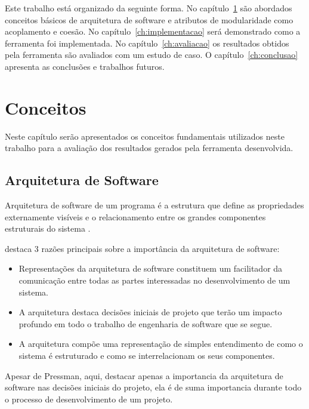 Este trabalho está organizado da seguinte forma. No capítulo~\ref{ch:conceitos}
são abordados conceitos básicos de arquitetura de software e atributos de
modularidade como acoplamento e coesão. No capítulo~\ref{ch:implementacao} será
demonstrado como a ferramenta foi implementada. No capítulo~\ref{ch:avaliacao}
os resultados obtidos pela ferramenta são avaliados com um estudo de caso. O
capítulo~\ref{ch:conclusao} apresenta as conclusões e trabalhos futuros.


\chapter{Conceitos} \label{ch:conceitos}

Neste capítulo serão apresentados os conceitos fundamentais utilizados neste
trabalho para a avaliação dos resultados gerados pela ferramenta desenvolvida.

\section{Arquitetura de Software}

Arquitetura de software de um programa é a estrutura que define as propriedades
externamente visíveis e o relacionamento entre os grandes componentes
estruturais do sistema \cite{engenhariaDeSoftwarePressman}.

 destaca 3 razões principais sobre a
importância da arquitetura de software:

\begin{itemize}

\item Representações da arquitetura de software constituem um facilitador da
comunicação entre todas as partes interessadas no desenvolvimento de um
sistema.

\item A arquitetura destaca decisões iniciais de projeto que terão um impacto
profundo em todo o trabalho de engenharia de software que se segue.

\item A arquitetura compõe uma representação de simples entendimento de como o
sistema é estruturado e como se interrelacionam os seus componentes.

\end{itemize}

Apesar de Pressman, aqui, destacar apenas a importancia da arquitetura de
software nas decisões iniciais do projeto, ela é de suma importancia durante
todo o processo de desenvolvimento de um projeto.

